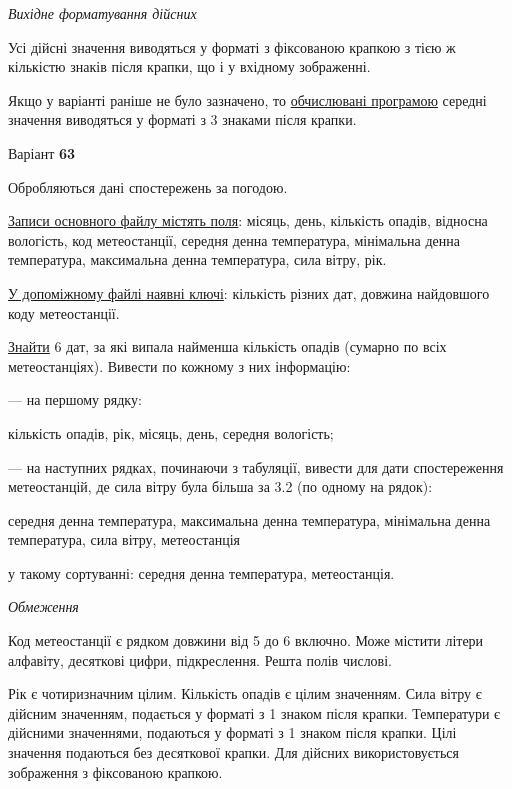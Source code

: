 \documentclass[11pt, ukrainian]{article}
\begin{document}
\textit{Вихідне форматування дійсних}

Усі дійсні значення виводяться у форматі з фіксованою крапкою з тією ж кількістю знаків після крапки, що і у вхідному зображенні.

Якщо у варіанті раніше не було зазначено, то \underline{обчислювані програмою} середні значення виводяться у форматі з 3 знаками після крапки.




\par
\newpage
{\center Варіант  \No \textbf { 63 }\par}
\bigskip
Обробляються дані спостережень за погодою. 

\underline{Записи основного файлу містять поля}: місяць, день, кількість опадів, відносна вологість, код метеостанції, середня денна температура, мінімальна денна температура, максимальна денна температура, сила вітру, рік.

\underline{У допоміжному файлі наявні ключі}: кількість різних дат, довжина найдовшого коду метеостанції.

\underline{Знайти} 6 дат, за які випала найменша кількість опадів (сумарно по всіх метеостанціях). Вивести по кожному з них інформацію:\par
{\noindent}--- на першому рядку:\par
кількість опадів, рік, місяць, день, середня вологість;

{\noindent}--- на наступних рядках, починаючи з табуляції, вивести для дати спостереження метеостанцій, де сила вітру була більша за 3.2 (по одному на рядок):\par
середня денна температура, максимальна денна температура, мінімальна денна температура, сила вітру, метеостанція

{\noindent}у такому сортуванні: середня денна температура, метеостанція.


\bigskip\textit{Обмеження}

Код метеостанції є рядком довжини від 5 до 6 включно.
Може містити літери алфавіту, десяткові цифри, підкреслення. Решта полів числові.

Рік є чотиризначним цілим.
Кількість опадів є цілим значенням.
Сила вітру є дійсним значенням, подається у форматі з 1 знаком після крапки.
Температури є дійсними значеннями, подаються у форматі з 1 знаком після крапки.
Цілі значення подаються без десяткової крапки.
Для дійсних використовується зображення з фіксованою крапкою.
\end{document}
